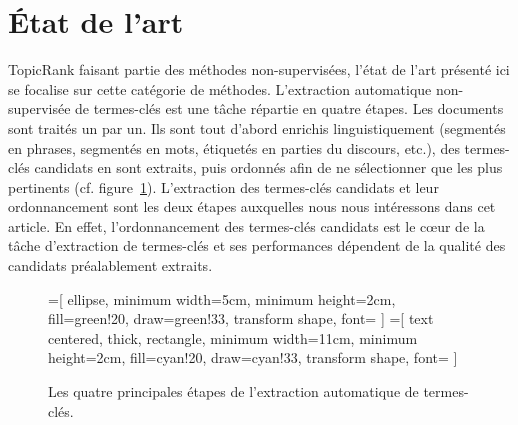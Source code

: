 \section{État de l'art}
\label{sec:etat_de_l_art}
  TopicRank faisant partie des méthodes non-supervisées, l'état de l'art
  présenté ici se focalise sur cette catégorie de méthodes.
  L'extraction automatique non-supervisée de termes-clés est une tâche répartie
  en quatre étapes. Les documents sont traités un par un. Ils sont tout d'abord
  enrichis linguistiquement (segmentés en phrases, segmentés en mots, étiquetés
  en parties du discours, etc.), des termes-clés candidats en sont extraits,
  puis ordonnés afin de ne sélectionner que les plus pertinents (cf.
  figure~\ref{fig:etapes_de_l_extraction_de_termes_cles}). L'extraction des
  termes-clés candidats et leur ordonnancement sont les deux étapes auxquelles
  nous nous intéressons dans cet article. En effet, l'ordonnancement des
  termes-clés candidats est le c\oe{}ur de la tâche d'extraction de termes-clés
  et ses performances dépendent de la qualité des candidats préalablement
  extraits.
  \begin{figure}
    =[
      ellipse,
      minimum width=5cm,
      minimum height=2cm,
      fill=green!20,
      draw=green!33,
      transform shape,
      font={\huge}
    ]
    =[
      text centered,
      thick,
      rectangle,
      minimum width=11cm,
      minimum height=2cm,
      fill=cyan!20,
      draw=cyan!33,
      transform shape,
      font={\huge\bfseries}
    ]

    \centering
    \caption{Les quatre principales étapes de l'extraction automatique de
             termes-clés. \label{fig:etapes_de_l_extraction_de_termes_cles}}
  \end{figure}

